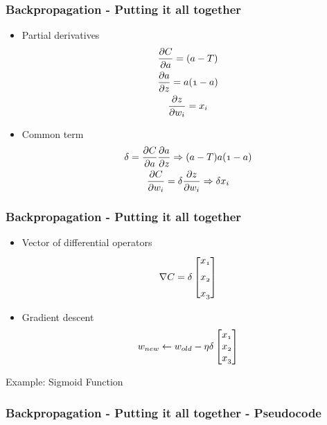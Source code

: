 \documentclass{beamer}
\newcommand{\var}[1]{\mathnormal{#1}}
\begin{document}
\begin{frame}
  \frametitle{Backpropagation - Putting it all together}
  \begin{itemize}
    \item Partial derivatives
      \begin{gather}
        \var{\frac{\partial C}{\partial a} = (a - T)} \\
        \var{\frac{\partial a}{\partial z} = a(1-a)} \\
        \var{\frac{\partial z}{\partial w_i} = x_i}
      \end{gather}
   \item Common term
     \begin{gather}
       \var{\delta = \frac{\partial C}{\partial a}\frac{\partial a}{\partial z} \Rightarrow (a - T) a (1 - a)} \\
       \var{\frac{\partial C}{\partial w_i} = \delta \frac{\partial z}{\partial w_i} \Rightarrow \delta x_i}
     \end{gather}
  \end{itemize}
\end{frame}

\begin{frame}
  \frametitle{Backpropagation - Putting it all together}
  \begin{itemize}
    \item Vector of differential operators
      \[
        \nabla C = \delta
          \begin{bmatrix}
            \var{x_1} \\[0.5em]
            \var{x_2} \\[0.5em]
            \var{x_3}
          \end{bmatrix}
      \]
    \item Gradient descent
      \begin{gather}
        \var{w}_{\var{new}} \leftarrow \var{w}_{\var{old}} - \eta \delta
          \begin{bmatrix}
            \var{x_1} \\
            \var{x_2} \\
            \var{x_3}
          \end{bmatrix}
      \end{gather}
  \end{itemize}
\end{frame}

\begin{frame}[fragile]{Example: Sigmoid Function}
  \frametitle{Backpropagation - Putting it all together - Pseudocode}
\end{frame}
\end{document}
